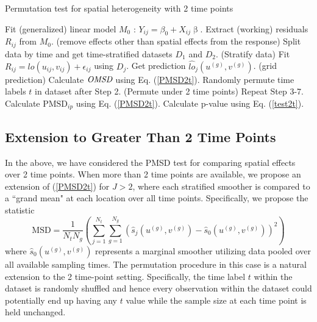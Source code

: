 	\begin{algorithm}[h]
		\caption{Permutation test for spatial heterogeneity with 2 time points}
		\label{alg:agrm2t}
		\begin{algorithmic}[1]
			\State Fit (generalized) linear model $M_0$ : $Y_{ij} = \beta_0 + X_{ij}\upbeta$. 
			\State Extract (working) residuals $R_{ij}$ from $M_0$. \hfill (remove effects other than spatial effects from the response)
			\State Split data by time and get time-stratified datasets $D_1$ and $D_2$. \hfill (Stratify data)
			\State Fit $R_{ij} = lo(u_{ij},v_{ij}) + \epsilon_{ij} $ using $D_j$. 
			\State Get prediction $\hat{lo}_{j}(u^{(g)},v^{(g)})$. \hfill (grid prediction)
			\EndFor
			\State Calculate $\emph{OMSD}$ using Eq. (\ref{PMSD2t}).
			\State Randomly permute time labels $t$ in dataset after Step 2. \hfill (Permute under 2 time points)
			\State Repeat Step 3-7.
			\State Calculate $\text{PMSD}_{ip}$ using Eq. (\ref{PMSD2t}).
			\EndFor
			\State Calculate p-value using Eq. (\ref{test2t}).
		\end{algorithmic}
	\end{algorithm}
	
	\subsection{Extension to Greater Than 2 Time Points}
	In the above, we have considered the PMSD test for comparing spatial effects over 2 time points. When more than 2 time points are available, we propose an extension of (\ref{PMSD2t}) for $J>2$, where each stratified smoother is compared to a ``grand mean" at each location over all time points. Specifically, we propose the statistic
	\begin{equation} \label{pmsd3}
	\text{MSD}=\frac{1}{N_t N_g} (\sum_{j=1}^{N_t}\sum_{g=1}^{N_g}(\hat{s}_{j}(u^{(g)},v^{(g)})-\hat{s}_{0}(u^{(g)},v^{(g)}))^2)
	\end{equation}
	where $\hat{s}_{0}(u^{(g)},v^{(g)})$ represents a marginal smoother utilizing data pooled over all available sampling times. The permutation procedure in this case is a natural extension to the 2 time-point setting. Specifically, the time label $t$ within the dataset is randomly shuffled and hence every observation within the dataset could potentially end up having any $t$ value while the sample size at each time point is held unchanged.
	
